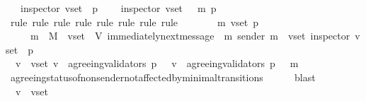 \begin{isabellebody}
\ \ {\isasymlongrightarrow}\ inspector\ {\isacharparenleft}v{\isacharunderscore}set{\isacharcomma}\ {\isasymsigma}{\isacharcomma}\ p{\isacharparenright}\ \isanewline
\ \ {\isasymlongrightarrow}\ inspector\ {\isacharparenleft}v{\isacharunderscore}set{\isacharcomma}\ {\isasymsigma}\ {\isasymunion}\ {\isacharbraceleft}m{\isacharbraceright}{\isacharcomma}\ p{\isacharparenright}{\isachardoublequoteclose}\isanewline
%
\isadelimproof
\ \ %
\endisadelimproof
%
\isatagproof
{}\isamarkupfalse%
\ {\isacharparenleft}rule{\isacharcomma}\ rule{\isacharcomma}\ rule{\isacharcomma}\ rule{\isacharcomma}\ rule{\isacharcomma}\ rule{\isacharcomma}\ rule{\isacharcomma}\ rule{\isacharparenright}\isanewline
{}\isamarkupfalse%
\ {\isacharminus}\ \isanewline
\ \ \isamarkupfalse%
\ {\isasymsigma}\ m\ v{\isacharunderscore}set\ p\isanewline
\ \ \isamarkupfalse%
\ {\isachardoublequoteopen}{\isasymsigma}\ {\isasymin}\ {\isasymSigma}\ {\isasymand}\ m\ {\isasymin}\ M\ {\isasymand}\ v{\isacharunderscore}set\ {\isasymsubseteq}\ V{\isachardoublequoteclose}\ {\isachardoublequoteopen}immediately{\isacharunderscore}next{\isacharunderscore}message\ {\isacharparenleft}{\isasymsigma}{\isacharcomma}\ m{\isacharparenright}{\isachardoublequoteclose}\ {\isachardoublequoteopen}sender\ m\ {\isasymnotin}\ v{\isacharunderscore}set{\isachardoublequoteclose}\ {\isachardoublequoteopen}inspector\ {\isacharparenleft}v{\isacharunderscore}set{\isacharcomma}\ {\isasymsigma}{\isacharcomma}\ p{\isacharparenright}{\isachardoublequoteclose}\ \isanewline
\ \ \isanewline
\ \ \isamarkupfalse%
\ \isamarkupfalse%
\ {\isachardoublequoteopen}{\isasymforall}\ v\ {\isasymin}\ v{\isacharunderscore}set{\isachardot}\ v\ {\isasymin}\ agreeing{\isacharunderscore}validators\ {\isacharparenleft}p{\isacharcomma}\ {\isasymsigma}{\isacharparenright}\ {\isasymlongrightarrow}\ v\ {\isasymin}\ agreeing{\isacharunderscore}validators\ {\isacharparenleft}p{\isacharcomma}\ {\isasymsigma}\ {\isasymunion}\ {\isacharbraceleft}m{\isacharbraceright}{\isacharparenright}{\isachardoublequoteclose}\isanewline
\ \ \ \ \isamarkupfalse%
\ agreeing{\isacharunderscore}status{\isacharunderscore}of{\isacharunderscore}non{\isacharunderscore}sender{\isacharunderscore}not{\isacharunderscore}affected{\isacharunderscore}by{\isacharunderscore}minimal{\isacharunderscore}transitions\isanewline
\ \ \ \ \isamarkupfalse%
\ blast\isanewline
\ \ \isanewline
\ \ \isamarkupfalse%
\ \isamarkupfalse%
\ {\isachardoublequoteopen}{\isasymforall}\ v\ {\isasymin}\ v{\isacharunderscore}set{\isachardot}\ \isanewline

\end{isabellebody}
